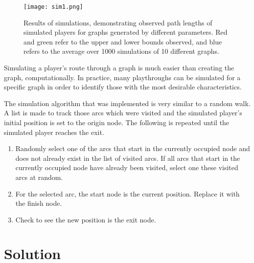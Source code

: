 \documentclass[landscape, a0, final]{a0poster}
\begin{document}
\begin{minipage}[c]{0.50\linewidth}
\begin{minipage}[c]{0.50\linewidth}
\begin{minipage}{0.9\linewidth}
\centering 
        \begin{figure}[H]
            \texttt{[image: sim1.png]} 
            \caption{Results of simulations, demonstrating observed path lengths of simulated players for graphs generated by different parameters.  Red and green refer to the upper and lower bounds observed, and blue refers to the average over 1000 simulations of 10 different graphs.} 
            \label{sim1}
        \end{figure}



\end{minipage} %
\end{minipage} %
\end{minipage} %
\begin{minipage}{0.25\linewidth} %
\begin{minipage}{0.9\linewidth} %

Simulating a player's route through a graph is much easier than creating the graph, computationally.  In practice, many playthroughs can be simulated for a specific graph in order to identify those with the most desirable characteristics.  

The simulation algorithm that was implemented is very similar to a random walk.  A list is made to track those arcs which were visited and the simulated player's initial position is set to the origin node.  The following is repeated until the simulated player reaches the exit.
    \begin{enumerate} 
        \item Randomly select one of the arcs that start in the currently occupied node and does not already exist in the list of visited arcs.  If all arcs that start in the currently occupied node have already been visited, select one these visited arcs at random.  
        \item For the selected arc, the start node is the current position.  Replace it with the finish node.
        \item Check to see the new position is the exit node.
    \end{enumerate} 

\section{Solution} 


\end{minipage}
\end{minipage}
\end{document}
